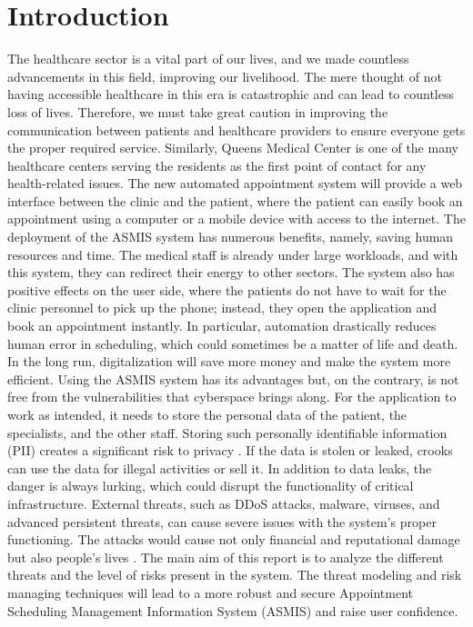 \chapter{Introduction}
The healthcare sector is a vital part of our lives, and we made countless advancements in this field, improving our livelihood. The mere thought of not having accessible healthcare in this era is catastrophic and can lead to countless loss of lives. Therefore, we must take great caution in improving the communication between patients and healthcare providers to ensure everyone gets the proper required service.\newline \newline
Similarly, Queens Medical Center is one of the many healthcare centers serving the 
residents as the first point of contact for any health-related issues. The new automated appointment system will provide a web interface between the clinic and the patient, where the patient can easily book an appointment using a computer or a mobile device with access to the internet.\newline\newline
The deployment of the ASMIS system has numerous benefits, namely, saving human resources and time. The medical staff is already under large workloads, and with this system, they can redirect their energy to other sectors. The system also has positive effects on the user side, where the patients do not have to wait for the clinic personnel to pick up the phone; instead, they open the application and book an appointment instantly. In particular, automation drastically reduces human error in scheduling, which could sometimes be a matter of life and death. In the long run, digitalization will save more money and make the system more efficient.\newline\newline
Using the ASMIS system has its advantages but, on the contrary, is not free from the vulnerabilities that cyberspace brings along. For the application to work as intended, it needs to store the personal data of the patient, the specialists, and the other staff. Storing such personally identifiable information (PII) creates a significant risk to privacy \citep[p.~374]{IOT}. If the data is stolen or leaked, crooks can use the data for illegal activities or sell it. In addition to data leaks, the danger is always lurking, which could disrupt the functionality of critical infrastructure. External threats, such as DDoS attacks, malware, viruses, and advanced persistent threats, can cause severe issues with the system's proper functioning. The attacks would cause not only financial and reputational damage but also people's lives \citep[p.~377]{IOT}.\newline\newline
The main aim of this report is to analyze the different threats and the level of risks present in the system. The threat modeling and risk managing techniques will lead to a more robust and secure Appointment Scheduling Management Information System (ASMIS) and raise user confidence.